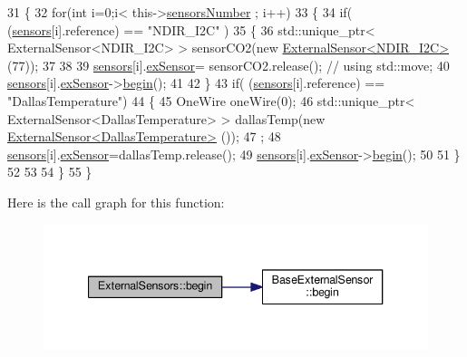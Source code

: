 \begin{DoxyCode}
31 \{
32     \textcolor{keywordflow}{for}(\textcolor{keywordtype}{int} i=0;i< this->\hyperlink{classExternalSensors_a58e4fbf9adeae787d92be5fa33043b5d}{sensorsNumber} ; i++)
33     \{
34         \textcolor{keywordflow}{if}( (\hyperlink{classExternalSensors_a284233f884fcf00154a44740cf1d9e1e}{sensors}[i].reference) == \textcolor{stringliteral}{"NDIR\_I2C"} )
35         \{   
36             std::unique\_ptr< ExternalSensor<NDIR\_I2C> > sensorCO2(\textcolor{keyword}{new} 
      \hyperlink{classExternalSensor_3_01NDIR__I2C_01_4}{ExternalSensor<NDIR\_I2C>} (77));
37 
38 
39             \hyperlink{classExternalSensors_a284233f884fcf00154a44740cf1d9e1e}{sensors}[i].\hyperlink{structExternalSensors_1_1sensor_a9bca150fd468b8d0e090e6d72c5c2b48}{exSensor}= sensorCO2.release();                       \textcolor{comment}{// using
       std::move;}
40             \hyperlink{classExternalSensors_a284233f884fcf00154a44740cf1d9e1e}{sensors}[i].\hyperlink{structExternalSensors_1_1sensor_a9bca150fd468b8d0e090e6d72c5c2b48}{exSensor}->\hyperlink{classBaseExternalSensor_a87d132803d4f4fdd4e66332809f0c9a0}{begin}();
41 
42         \}
43         \textcolor{keywordflow}{if}( (\hyperlink{classExternalSensors_a284233f884fcf00154a44740cf1d9e1e}{sensors}[i].reference) == \textcolor{stringliteral}{"DallasTemperature"})
44         \{
45             OneWire oneWire(0);
46             std::unique\_ptr< ExternalSensor<DallasTemperature> > dallasTemp(\textcolor{keyword}{new} 
      \hyperlink{classExternalSensor_3_01DallasTemperature_01_4}{ExternalSensor<DallasTemperature>} ());
47              ;
48             \hyperlink{classExternalSensors_a284233f884fcf00154a44740cf1d9e1e}{sensors}[i].\hyperlink{structExternalSensors_1_1sensor_a9bca150fd468b8d0e090e6d72c5c2b48}{exSensor}=dallasTemp.release();
49             \hyperlink{classExternalSensors_a284233f884fcf00154a44740cf1d9e1e}{sensors}[i].\hyperlink{structExternalSensors_1_1sensor_a9bca150fd468b8d0e090e6d72c5c2b48}{exSensor}->\hyperlink{classBaseExternalSensor_a87d132803d4f4fdd4e66332809f0c9a0}{begin}();
50             
51         \}
52         
53         
54     \}
55 \}
\end{DoxyCode}
Here is the call graph for this function\+:
\nopagebreak
\begin{figure}[H]
\begin{center}
\leavevmode
\includegraphics[width=340pt]{classExternalSensors_a58ede0d786a86417254708870f04a21e_cgraph}
\end{center}
\end{figure}
